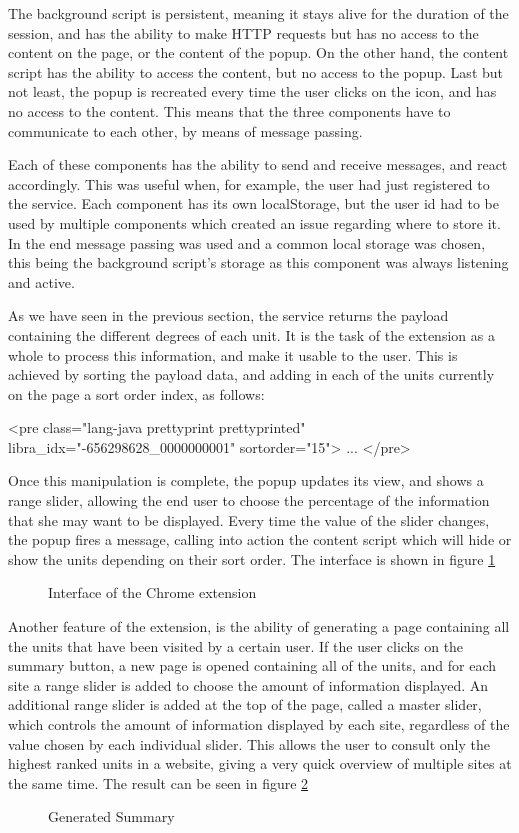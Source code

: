 The background script is persistent, meaning it stays alive for the duration of the session, and has the ability to make HTTP requests but has no access to the content on the page, or the content of the popup. On the other hand, the content script has the ability to access the content, but no access to the popup. Last but not least, the popup is recreated every time the user clicks on the icon, and has no access to the content. This means that the three components have to communicate to each other, by means of message passing. 

Each of these components has the ability to send and receive messages, and react accordingly. This was useful when, for example, the user had just registered to the service. Each component has its own localStorage, but the user id had to be used by multiple components which created an issue regarding where to store it. In the end message passing was used and a common local storage was chosen, this being the background script's storage as this component was always listening and active.


As we have seen in the previous section, the service returns the payload containing the different degrees of each unit. It is the task of the extension as a whole to process this information, and make it usable to the user. This is achieved by sorting the payload data, and adding in each of the units currently on the page a sort order index, as follows:
\begin{htmlcode}
<pre class="lang-java prettyprint prettyprinted" libra_idx="-656298628_0000000001" sortorder="15">
	...
</pre>	
\end{htmlcode}
Once this manipulation is complete, the popup updates its view, and shows a range slider, allowing the end user to choose the percentage of the information that she may want to be displayed. Every time the value of the slider changes, the popup fires a message, calling into action the content script which will hide or show the units depending on their sort order. The interface is shown in figure \ref{fig:chromeExtensionInterfaceScreenshot}

\begin{figure}[H]
\centering
{}	
\caption{Interface of the Chrome extension}
\label{fig:chromeExtensionInterfaceScreenshot}
\end{figure}

Another feature of the extension, is the ability of generating a page containing all the units that have been visited by a certain user. If the user clicks on the summary button, a new page is opened containing all of the units, and for each site a range slider is added to choose the amount of information displayed. An additional range slider is added at the top of the page, called a master slider, which controls the amount of information displayed by each site, regardless of the value chosen by each individual slider. This allows the user to consult only the highest ranked units in a website, giving a very quick overview of multiple sites at the same time. The result can be seen in figure \ref{fig:chromeExtensionSummaryScreenshot}

\begin{figure}[H]
\centering
{}
\caption{Generated Summary}
\label{fig:chromeExtensionSummaryScreenshot}
\end{figure}
